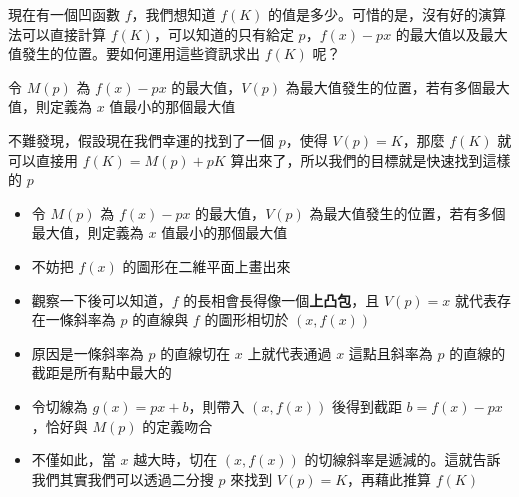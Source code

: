 \documentclass[standalone]{beamer}
\begin{document}
\begin{frame}{}
  \begin{problem}[等價的問題]
    現在有一個凹函數 $f$，我們想知道 $f(K)$ 的值是多少。可惜的是，沒有好的演算法可以直接計算 $f(K)$，可以知道的只有給定 $p$，$f(x) - px$ 的最大值以及最大值發生的位置。要如何運用這些資訊求出 $f(K)$ 呢？
  \end{problem}

  令 $M(p)$ 為 $f(x) - px$ 的最大值，$V(p)$ 為最大值發生的位置，若有多個最大值，則定義為 $x$ 值最小的那個最大值

  不難發現，假設現在我們幸運的找到了一個 $p$，使得 $V(p) = K$，那麼 $f(K)$ 就可以直接用 $f(K) = M(p) + pK$ 算出來了，所以我們的目標就是快速找到這樣的 $p$
\end{frame}

\begin{frame}{}
  \begin{itemize}
    \item 令 $M(p)$ 為 $f(x) - px$ 的最大值，$V(p)$ 為最大值發生的位置，若有多個最大值，則定義為 $x$ 值最小的那個最大值
    \item 不妨把 $f(x)$ 的圖形在二維平面上畫出來
    \item 觀察一下後可以知道，$f$ 的長相會長得像一個\textbf{上凸包}，且 $V(p) = x$ 就代表存在一條斜率為 $p$ 的直線與 $f$ 的圖形相切於 $(x, f(x))$
    \item 原因是一條斜率為 $p$ 的直線切在 $x$ 上就代表通過 $x$ 這點且斜率為 $p$ 的直線的截距是所有點中最大的
    \item 令切線為 $g(x) = px + b$，則帶入 $(x, f(x))$ 後得到截距 $b = f(x) - px$，恰好與 $M(p)$ 的定義吻合
    \item 不僅如此，當 $x$ 越大時，切在 $(x, f(x))$ 的切線斜率是遞減的。這就告訴我們其實我們可以透過二分搜 $p$ 來找到 $V(p) = K$，再藉此推算 $f(K)$ 
  \end{itemize}
\end{frame}
\end{document}

